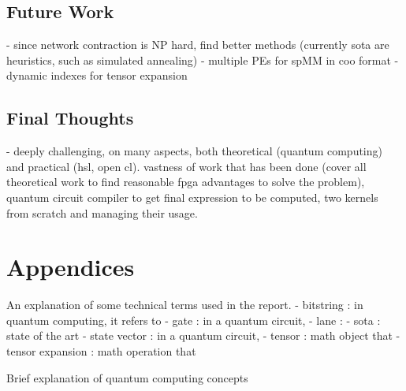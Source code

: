 \documentclass[12pt,oneside,a4paper]{article}
\begin{document}
\subsection{Future Work}
- since network contraction is NP hard, find better methods (currently sota are heuristics, such as simulated annealing)
- multiple PEs for spMM in coo format
- dynamic indexes for tensor expansion

\subsection{Final Thoughts}
- deeply challenging, on many aspects, both theoretical (quantum computing) and practical (hsl, open cl). vastness of work that has been done (cover all theoretical work to find reasonable fpga advantages to solve the problem), quantum circuit compiler to get final expression to be computed, two kernels from scratch and managing their usage.





\printbibliography[title={\section{References}}]




\section{Appendices}
An explanation of some technical terms used in the report.
- bitstring : in quantum computing, it refers to
- gate : in a quantum circuit,
- lane :
- sota : state of the art
- state vector : in a quantum circuit,
- tensor : math object that
- tensor expansion : math operation that

Brief explanation of quantum computing concepts


\end{document}
